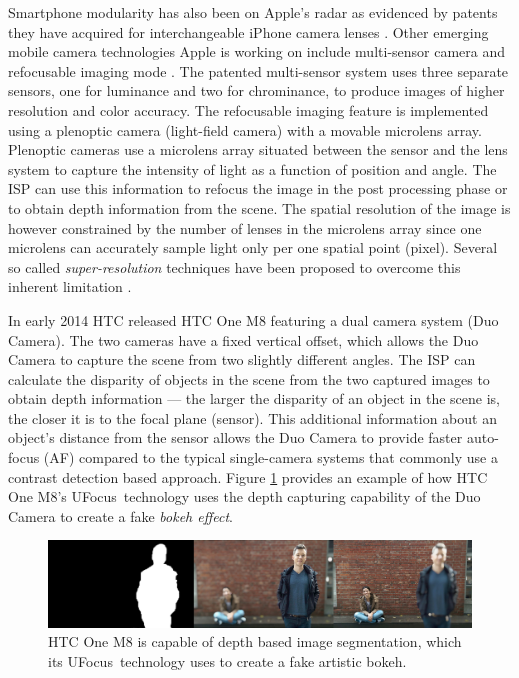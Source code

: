 \documentclass[thesis.tex]{subfiles}
\begin{document}
Smartphone modularity has also been on Apple's radar as evidenced by patents they have acquired for interchangeable iPhone camera lenses \cite{apple_patent_camera_module_3}\cite{apple_patent_camera_module_4}\cite{apple_patent_camera_module_5}. Other emerging mobile camera technologies Apple is working on include multi-sensor camera and refocusable imaging mode \cite{apple_patent_camera_module_1}\cite{apple_patent_camera_module_2}. The patented multi-sensor system uses three separate sensors, one for luminance and two for chrominance, to produce images of higher resolution and color accuracy. The refocusable imaging feature is implemented using a plenoptic camera (light-field camera) with a movable microlens array. Plenoptic cameras use a microlens array situated between the sensor and the lens system to capture the intensity of light as a function of position and angle. The ISP can use this information to refocus the image in the post processing phase or to obtain depth information from the scene. The spatial resolution of the image is however constrained by the number of lenses in the microlens array since one microlens can accurately sample light only per one spatial point (pixel). Several so called \textit{super-resolution} techniques have been proposed to overcome this inherent limitation \cite{plenoptic_1}\cite{plenoptic_2}\cite{plenoptic_3}.

In early 2014 HTC released HTC One M8 featuring a dual camera system (Duo Camera). The two cameras have a fixed vertical offset, which allows the Duo Camera to capture the scene from two slightly different angles. The ISP can calculate the disparity of objects in the scene from the two captured images to obtain depth information --- the larger the disparity of an object in the scene is, the closer it is to the focal plane (sensor). This additional information about an object's distance from the sensor allows the Duo Camera to provide faster auto-focus (AF) compared to the typical single-camera systems that commonly use a contrast detection based approach. Figure \ref{figure:htc-ufocus} provides an example of how HTC One M8's UFocus\texttrademark\ technology uses the depth capturing capability of the Duo Camera to create a fake \emph{bokeh effect}.

\begin{figure}[h]
\centering \includegraphics[width=\textwidth]{images/htc-ufocus.jpg}
\caption{HTC One M8 is capable of depth based image segmentation, which its UFocus\texttrademark\ technology uses to create a fake artistic bokeh.\label{figure:htc-ufocus} \cite{htc_one_ufocus}}
\end{figure}
\end{document}
